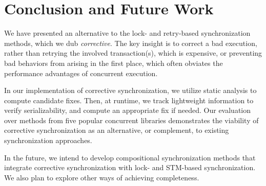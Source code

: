 \section{Conclusion and Future Work}

We have presented an alternative to the lock- and retry-based synchronization methods, which we dub \emph{corrective}. The key insight is to correct a bad execution, rather than retrying the involved transaction(s), which is expensive, or preventing bad behaviors from arising in the first place, which often obviates the performance advantages of concurrent execution.

In our implementation of corrective synchronization, we utilize static analysis to compute candidate fixes. Then, at runtime, we track lightweight information to verify serializability, and compute an appropriate fix if needed. Our evaluation over methods from five popular concurrent libraries demonstrates the viability of corrective synchronization as an alternative, or complement, to existing synchronization approaches. 

In the future, we intend to develop compositional synchronization methods that integrate corrective synchronization with lock- and STM-based synchronization. We also plan to explore other ways of achieving completeness. 